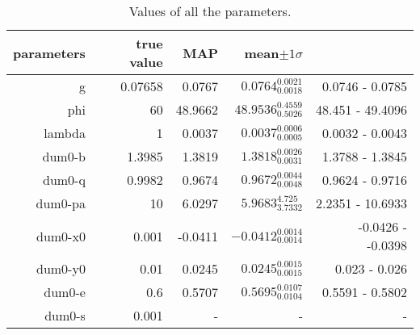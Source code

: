 \begin{table*}\caption{Values of all the parameters.}\begin{center}\begin{tabular}{ r r r r r} parameters & true value & MAP & mean$\pm 1 \sigma$ \\ 
\hline  g & 0.07658 & 0.0767 & $0.0764_{0.0018}^{0.0021}$ & 0.0746 - 0.0785 \\ 
 phi & 60 & 48.9662 & $48.9536_{0.5026}^{0.4559}$ & 48.451 - 49.4096 \\ 
\hline lambda & 1 & 0.0037 & $0.0037_{0.0005}^{0.0006}$ & 0.0032 - 0.0043 \\ 
\hline dum0-b & 1.3985 & 1.3819 & $1.3818_{0.0031}^{0.0026}$ & 1.3788 - 1.3845 \\ 
 dum0-q & 0.9982 & 0.9674 & $0.9672_{0.0048}^{0.0044}$ & 0.9624 - 0.9716 \\ 
 dum0-pa & 10 & 6.0297 & $5.9683_{3.7332}^{4.725}$ & 2.2351 - 10.6933 \\ 
 dum0-x0 & 0.001 & -0.0411 & $-0.0412_{0.0014}^{0.0014}$ & -0.0426 - -0.0398 \\ 
 dum0-y0 & 0.01 & 0.0245 & $0.0245_{0.0015}^{0.0015}$ & 0.023 - 0.026 \\ 
 dum0-e & 0.6 & 0.5707 & $0.5695_{0.0104}^{0.0107}$ & 0.5591 - 0.5802 \\ 
 dum0-s & 0.001 & - & - & - \\ 
\hline\end{tabular}\end{center}\label{tab:1}\end{table*}